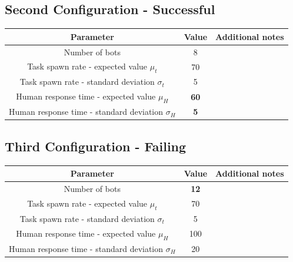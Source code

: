 \documentclass[10pt,a4paper]{article}
\begin{document}
		\subsection{Second Configuration - Successful}
			\begin{center}
				\begin{tabular}{ |c|c|c|}
					\hline
					Parameter & Value & Additional notes\\
					\hline
					\hline
					Number of bots & 8 &\\
					\hline
					Task spawn rate - expected value $\mu_t$ & 70 &\\
					\hline					
					Task spawn rate - standard deviation $\sigma_t$ & 5 &\\
					\hline
					Human response time - expected value $\mu_H$ & \textbf{60}\footnotemark &\\
					\hline					
					Human response time - standard deviation $\sigma_H$ & \textbf{5} &\\
					\hline
				\end{tabular}
			\end{center}
			
		\subsection{Third Configuration - Failing}
			\begin{center}
				\begin{tabular}{ |c|c|c|}
					\hline
					Parameter & Value & Additional notes\\
					\hline
					\hline
					Number of bots & \textbf{12} &\\
					\hline
					Task spawn rate - expected value $\mu_t$ & 70 &\\
					\hline					
					Task spawn rate - standard deviation $\sigma_t$ & 5 &\\
					\hline
					Human response time - expected value $\mu_H$ & 100 &\\
					\hline					
					Human response time - standard deviation $\sigma_H$ & 20 &\\
					\hline
				\end{tabular}
			\end{center}
\end{document}
